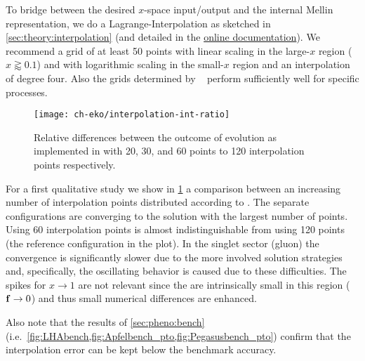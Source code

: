 To bridge between the desired $x$-space input/output and the internal
Mellin representation, we do a Lagrange-Interpolation as sketched in
\cref{sec:theory:interpolation}
(and detailed in the \href{https://eko.readthedocs.io/en/latest/}{online documentation}).
We recommend a grid of at least 50 points with
linear scaling in the large-$x$ region ($x \gtrapprox 0.1$) and with logarithmic
scaling in the small-$x$ region and an interpolation of degree four.
Also the grids determined by \amcfast~\cite{Bertone:2014zva} perform
sufficiently well for specific processes.

\begin{figure}
    \begin{center}
    \texttt{[image: ch-eko/interpolation-int-ratio]}
    \end{center}
    \caption{Relative differences between 
        the outcome of \nnlo{} \qcd{} evolution
        as implemented in \eko{} with 20, 30, and 60 points to 120
        interpolation points respectively.
        \label{fig:interpolation} }
\end{figure}

For a first qualitative study we show in \cref{fig:interpolation} a
comparison between an increasing number of interpolation points
distributed according to \cite[Eq. 2.12]{Carrazza_2020}.
The separate configurations are converging to the solution with the
largest number of points. Using 60 interpolation points is almost
indistinguishable from using 120 points (the reference configuration in the plot).
In the singlet sector (gluon) the convergence is
significantly slower due to the more involved solution strategies and,
specifically, the oscillating behavior is caused due to these difficulties.
The spikes for $x\to 1$ are not relevant since the \pdfs are intrinsically
small in this region ($\vb f\to 0$) and thus small numerical differences
are enhanced.

Also note that the results of \cref{sec:pheno:bench} (i.e.\ \cref{fig:LHAbench,fig:Apfelbench_pto,fig:Pegasusbench_pto}) confirm that
the interpolation error can be kept below the benchmark accuracy.
